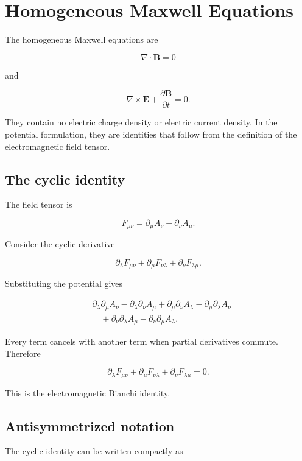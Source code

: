 \section{Homogeneous Maxwell Equations}
\label{sec:homogeneous_maxwell_equations}

The homogeneous Maxwell equations are

\[
\boxed{
\nabla\cdot\mathbf{B}=0
}
\]

and

\[
\boxed{
\nabla\times\mathbf{E}
+
\frac{\partial\mathbf{B}}{\partial t}
=0
}.
\]

They contain no electric charge density or electric current density. In the potential formulation, they are identities that follow from the definition of the electromagnetic field tensor.

\subsection{The cyclic identity}

The field tensor is

\[
F_{\mu\nu}
=
\partial_{\mu}A_{\nu}
-
\partial_{\nu}A_{\mu}.
\]

Consider the cyclic derivative

\[
\partial_{\lambda}F_{\mu\nu}
+
\partial_{\mu}F_{\nu\lambda}
+
\partial_{\nu}F_{\lambda\mu}.
\]

Substituting the potential gives

\[
\begin{aligned}
&\partial_{\lambda}\partial_{\mu}A_{\nu}
-
\partial_{\lambda}\partial_{\nu}A_{\mu}
+
\partial_{\mu}\partial_{\nu}A_{\lambda}
-
\partial_{\mu}\partial_{\lambda}A_{\nu}
\\
&\quad+
\partial_{\nu}\partial_{\lambda}A_{\mu}
-
\partial_{\nu}\partial_{\mu}A_{\lambda}.
\end{aligned}
\]

Every term cancels with another term when partial derivatives commute. Therefore

\[
\boxed{
\partial_{\lambda}F_{\mu\nu}
+
\partial_{\mu}F_{\nu\lambda}
+
\partial_{\nu}F_{\lambda\mu}
=0
}.
\]

This is the electromagnetic Bianchi identity.

\subsection{Antisymmetrized notation}

The cyclic identity can be written compactly as

